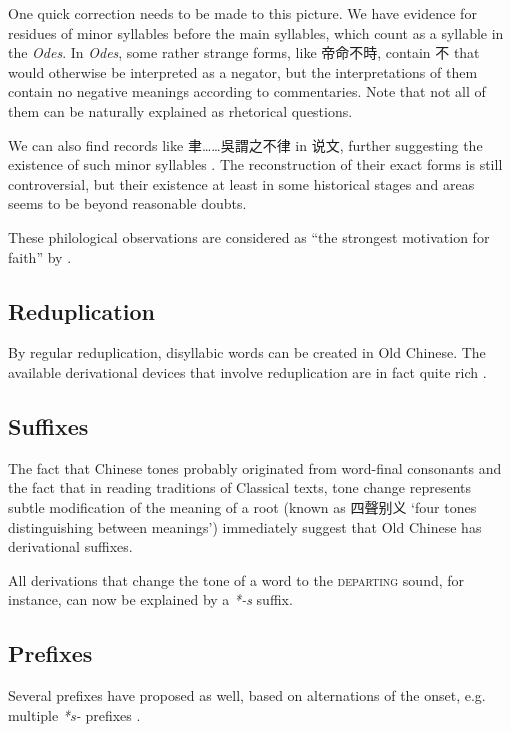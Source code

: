 \documentclass[UTF8, a4paper, oneside, scheme=plain, 12pt]{ctexrep}
\newcommand*{\citepages}[1]{pp.~{#1}}
\newcommand{\form}[1]{\emph{#1}}
\newcommand{\work}[1]{\textit{#1}}
\newcommand{\translate}[1]{`#1'}
\newcommand*{\category}[1]{\textsc{#1}}
\begin{document}
One quick correction needs to be made to this picture.
We have evidence for residues of minor syllables before the main syllables,
which count as a syllable in the \work{Odes}.
In \form{Odes}, some rather strange forms, like 帝命不時,
contain 不 that would otherwise be interpreted as a negator,
but the interpretations of them contain no negative meanings
according to commentaries.
Note that not all of them can be naturally explained as rhetorical questions.

We can also find records like 聿……吳謂之不律 in 说文,
further suggesting the existence of such minor syllables
\citep[\citepages{122-1235}]{hill2019historical}.
The reconstruction of their exact forms is still controversial,
but their existence at least in some historical stages and areas seems to be beyond reasonable doubts.

These philological observations are considered as ``the strongest motivation for faith'' by \citet[\citepages{122-124}]{hill2019historical}.

\subsection{Reduplication}

By regular reduplication, disyllabic words can be created in Old Chinese.
The available derivational devices that involve reduplication are in fact quite rich \citep{sun2008reduplication}.

\subsection{Suffixes}

The fact that Chinese tones probably originated from word-final consonants
and the fact that in reading traditions of Classical texts,
tone change represents subtle modification of the meaning of a root
(known as 四聲别义 \translate{four tones distinguishing between meanings})
immediately suggest that Old Chinese has derivational suffixes.

All derivations that change the tone of a word to the \category{departing} sound,
for instance, can now be explained by a \form{*-s} suffix.


\subsection{Prefixes}

Several prefixes have proposed as well,
based on alternations of the onset,
e.g. multiple \form{*s-} prefixes \citep[\citepages{53-59}]{baxter2014old}.
\end{document}
